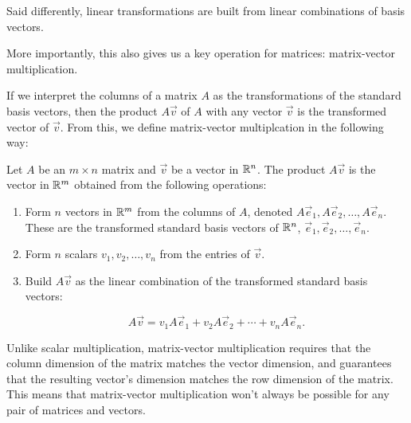 \documentclass{ximera}
\begin{document}
\begin{exploration}
\begin{remark}
\begin{definition}
            Said differently, linear transformations are built from linear combinations of basis vectors.
          \end{definition}

        More importantly, this also gives us a key operation for matrices: matrix-vector multiplication. 

        If we interpret the columns of a matrix $A$ as the transformations of the standard basis vectors, then the product $A\vec{v}$ of $A$ with any vector $\vec{v}$ is the transformed vector of $\vec{v}$. From this, we define matrix-vector multiplcation in the following way:

        \begin{definition}
            Let $A$ be an $m\times n$ matrix and $\vec{v}$ be a vector in $\mathbb{R}^n$. The product $A\vec{v}$ is the vector in $\mathbb{R}^m$ obtained from the following operations:
            
            \begin{enumerate}

                \item Form $n$ vectors in $\mathbb{R}^m$ from the columns of $A$, denoted $A\vec{e}_1, A\vec{e}_2, \ldots, A\vec{e}_n$. These are the transformed standard basis vectors of $\mathbb{R}^n$, $\vec{e}_1, \vec{e}_2, \ldots, \vec{e}_n$.
                
                \item Form $n$ scalars $v_1, v_2, \ldots, v_n$ from the entries of $\vec{v}$.
                
                \item Build $A\vec{v}$ as the linear combination of the transformed standard basis vectors:
                
                $$A\vec{v} = v_1A\vec{e}_1 + v_2A\vec{e}_2 + \cdots + v_nA\vec{e}_n.$$

            \end{enumerate}
        \end{definition}

        Unlike scalar multiplication, matrix-vector multiplication requires that the column dimension of the matrix matches the vector dimension, and guarantees that the resulting vector's dimension matches the row dimension of the matrix. This means that matrix-vector multiplication won't always be possible for any pair of matrices and vectors.

        \begin{example}


\end{example}
\end{remark}
\end{exploration}
\end{document}
